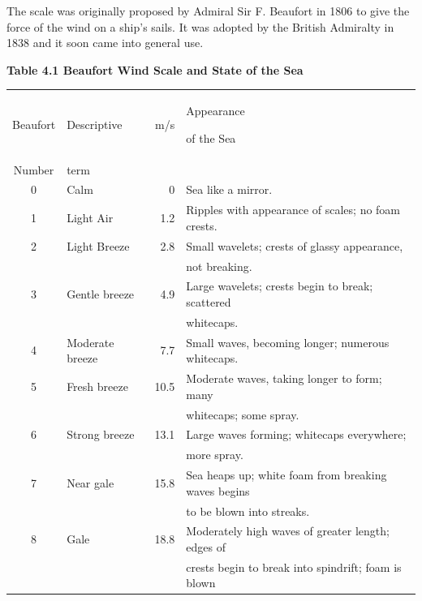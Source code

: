 The scale was originally proposed by Admiral Sir F. Beaufort in 1806
to give the force of the wind on a ship's sails. It was adopted by the
British Admiralty in 1838 and it soon came into general use.

\begin{table}[t!] {\textbf{\footnotesize{Table 4.1 Beaufort Wind Scale and State of the Sea}}}
\\[1ex]
\begin{footnotesize}
\begin{tabular}{@{}clrp{70mm}@{}} \hline
Beaufort    & Descriptive & m/s & Appearance \rule{0ex}{2.5ex}of the Sea \\
Number & term \  &  & \\[0.5ex]
\hline  %
0 & Calm \rule{0ex}{2.5ex}  &   0 & Sea like a mirror. \\
1 & Light Air&  1.2 &   Ripples with appearance of scales; no foam crests.\\
2 & Light Breeze &  2.8 &   Small wavelets; crests of glassy appearance, \\
\ &\ &\ & \hspace{1em}not breaking. \\
3 & Gentle breeze&  4.9 &   Large wavelets; crests begin to break; scattered\\
\ &\ &\ & \hspace{1em}whitecaps.\\
4 & Moderate breeze & 7.7 & Small waves, becoming longer; numerous whitecaps. \\
5 & Fresh breeze &  10.5 &  Moderate waves, taking longer to form; many\\
\ &\ &\ & \hspace{1em}whitecaps; some spray. \\
6 & Strong breeze & 13.1 &  Large waves forming; whitecaps everywhere; \\
\ &\ &\ &\hspace{1em}more spray. \\
7 & Near gale & 15.8 &  Sea heaps up; white foam from breaking waves begins\\
\ &\ &\ & \hspace{1em}to be blown into streaks.\\
8 & Gale &      18.8  & Moderately high waves of greater length; edges of \\
\ &\ &\ & \hspace{1em}crests begin to break into spindrift; foam is blown \\

\end{tabular}
\end{footnotesize}
\end{table}
